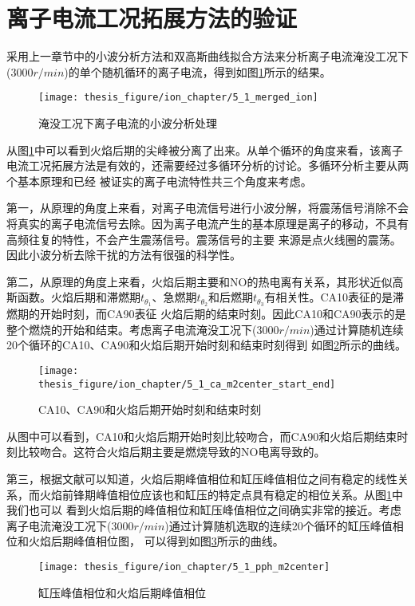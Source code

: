 \section{离子电流工况拓展方法的验证}
采用上一章节中的小波分析方法和双高斯曲线拟合方法来分析离子电流淹没工况下($3000r/min$)的单个随机循环的离子电流，得到如图\ref{fig:5_1_merged_ion}所示的结果。
\begin{figure}[!htb]
	\centering
	\texttt{[image: thesis\_figure/ion\_chapter/5\_1\_merged\_ion]}
	\caption{\label{fig:5_1_merged_ion}淹没工况下离子电流的小波分析处理}
\end{figure}
从图\ref{fig:5_1_merged_ion}中可以看到火焰后期的尖峰被分离了出来。从单个循环的角度来看，该离子电流工况拓展方法是有效的，还需要经过多循环分析的讨论。多循环分析主要从两个基本原理和已经
被证实的离子电流特性共三个角度来考虑。\par
第一，从原理的角度上来看，对离子电流信号进行小波分解，将震荡信号消除不会将真实的离子电流信号去除。因为离子电流产生的基本原理是离子的移动，不具有高频往复的特性，不会产生震荡信号。震荡信号的主要
来源是点火线圈的震荡。因此小波分析去除干扰的方法有很强的科学性。\par
第二，从原理的角度上来看，火焰后期主要和NO的热电离有关系，其形状近似高斯函数。火焰后期和滞燃期$t_{\theta_1}$、急燃期$t_{\theta_2}$和后燃期$t_{\theta_3}$有相关性。CA10表征的是滞燃期的开始时刻，而CA90表征
火焰后期的结束时刻。因此CA10和CA90表示的是整个燃烧的开始和结束。考虑离子电流淹没工况下($3000r/min$)通过计算随机连续20个循环的CA10、CA90和火焰后期开始时刻和结束时刻得到
如图\ref{fig:5_1_ca_m2center_start_end}所示的曲线。\par
\begin{figure}[!htb]
	\centering
	\texttt{[image: thesis\_figure/ion\_chapter/5\_1\_ca\_m2center\_start\_end]}
	\caption{\label{fig:5_1_ca_m2center_start_end}CA10、CA90和火焰后期开始时刻和结束时刻}
\end{figure}
从图中可以看到，CA10和火焰后期开始时刻比较吻合，而CA90和火焰后期结束时刻比较吻合。这符合火焰后期主要是燃烧导致的NO电离导致的。\par
第三，根据文献可以知道，火焰后期峰值相位和缸压峰值相位之间有稳定的线性关系，而火焰前锋期峰值相位应该也和缸压的特定点具有稳定的相位关系。从图\ref{fig:5_1_merged_ion}中我们也可以
看到火焰后期的峰值相位和缸压峰值相位之间确实非常的接近。考虑离子电流淹没工况下($3000r/min$)通过计算随机选取的连续20个循环的缸压峰值相位和火焰后期峰值相位图，
可以得到如图\ref{fig:5_1_pph_m2center}所示的曲线。\par
\begin{figure}[!htb]
	\centering
	\texttt{[image: thesis\_figure/ion\_chapter/5\_1\_pph\_m2center]}
	\caption{\label{fig:5_1_pph_m2center}缸压峰值相位和火焰后期峰值相位}
\end{figure}
